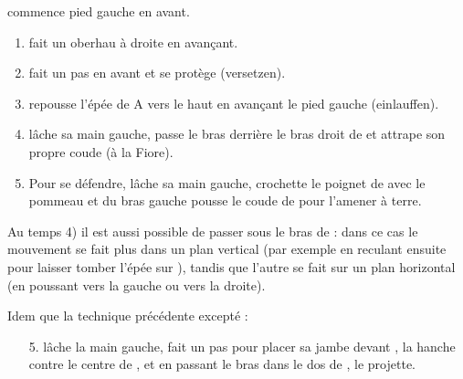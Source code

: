 \begin{technique}
\label{épée-longue:tech:dg-armringen-einlauffen}

\A commence pied gauche en avant.

\begin{enumerate}
	\item \A fait un oberhau à droite en avançant.
	\item \D fait un pas en avant et se protège (versetzen).
	\item \D repousse l'épée de A vers le haut en avançant le pied gauche (einlauffen).
	\item \D lâche sa main gauche, passe le bras derrière le bras droit de \A et attrape son propre coude (à la Fiore).
	\item Pour se défendre, \A lâche sa main gauche, crochette le poignet de \D avec le pommeau et du bras gauche pousse le coude de \D pour l'amener à terre.
\end{enumerate}

Au temps 4) il est aussi possible de passer sous le bras de \A : dans ce cas le mouvement se fait plus dans un plan vertical (par exemple en reculant ensuite pour laisser tomber l'épée sur \A), tandis que l'autre se fait sur un plan horizontal (en poussant \A vers la gauche ou vers la droite).

\end{technique}


\begin{technique}
\label{épée-longue:tech:dg-leibringen-einlauffen}

Idem que la technique précédente excepté :
\begin{enumerate}
	\item[5.] \A lâche la main gauche, fait un pas pour placer sa jambe devant \D, la hanche contre le centre de \D, et en passant le bras dans le dos de \D, \A le projette.
\end{enumerate}

\end{technique}



